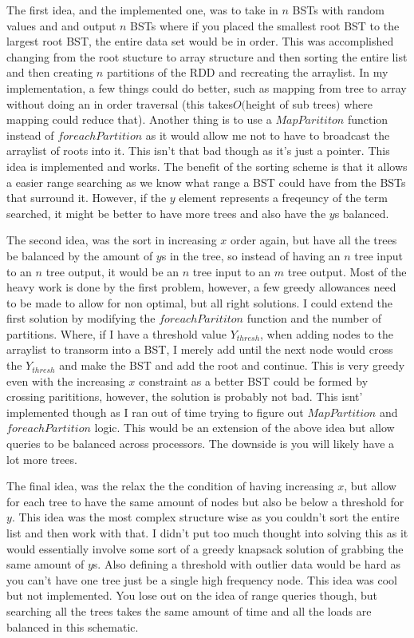 \documentclass[titlepage]{article}
\begin{document}
The first idea, and the implemented one, was to take in $n$ BSTs with random values  and and output $n$ BSTs where if you  placed the smallest root BST to the largest root BST, the entire data set would be in order.  This was accomplished changing from the root stucture to array structure and then sorting the entire list and then creating $n$ partitions of the RDD and recreating the arraylist.
In my implementation, a few things could do better, such as mapping from tree to array without doing an in order traversal (this takes$O($height of sub trees$)$ where mapping could reduce that).  Another thing is to use a $MapParititon$ function instead of $foreachPartition$ as it would allow me not to have to broadcast the arraylist of roots into it.  This isn't that bad though as it's just a pointer.  This idea is implemented and works.  The benefit of the sorting scheme is that it allows a easier range searching as we know what range a BST could have from the BSTs that surround it.  However, if the $y$ element represents a freqeuncy of the term searched, it might be better to have more trees and also have the $y$s balanced.

The second idea, was the sort in increasing $x$ order again, but have all the trees be balanced by the amount of $y$s in the tree, so instead of having an $n$ tree input to an $n$ tree output, it would be an $n$ tree input to an $m$ tree output.  Most of the heavy work is done by the first problem, however, a few greedy allowances need to be made to allow for non optimal, but all right solutions.  
I could extend the first solution by modifying the $foreachParititon$ function and the number of partitions.  Where, if I have a threshold value $Y_{thresh}$, when adding nodes to the arraylist to transorm into a BST, I merely add until the next node would cross the $Y_{thresh}$ and make the BST and add the root and continue.  This is very greedy even with the increasing $x$ constraint as a better BST could be formed by crossing parititions, however, the solution is probably not bad.  This isnt' implemented though as I ran out of time trying to figure out $MapPartition$ and $foreachPartition$ logic.  This would be an extension of the above idea but allow queries to be balanced across processors.  The downside is you will likely have a lot more trees.

The final idea, was the relax the the condition of having increasing $x$, but allow for each tree to have the same amount of nodes but also be below a threshold for $y$.  This idea was the most complex structure wise as you couldn't sort the entire list and then work with that.  I didn't put too much thought into solving this as it would essentially involve some sort of a greedy knapsack solution of grabbing the same amount of $y$s.  Also defining a threshold with outlier data would be hard as you can't have one tree just be a single high frequency node.  This idea was cool but not implemented.  You lose out on the idea of range queries though, but searching all the trees takes the same amount of time and all the loads are balanced in this schematic.
\end{document}
